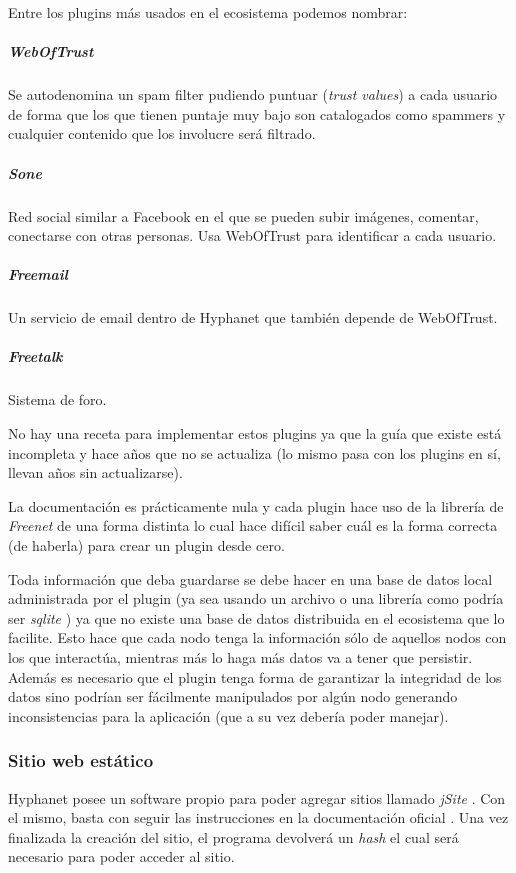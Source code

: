 Entre los plugins más usados en el ecosistema podemos nombrar:

\subparagraph{WebOfTrust} \cite{hyphanet-web-of-trust}
Se autodenomina un spam filter pudiendo puntuar (\textit{trust values}) a cada usuario de forma que los que tienen puntaje muy bajo son catalogados como spammers y cualquier contenido que los involucre será filtrado.

\subparagraph{Sone} \cite{hyphanter-sone}
Red social similar a Facebook en el que se pueden subir imágenes, comentar, conectarse con otras personas. Usa WebOfTrust para identificar a cada usuario.

\subparagraph{Freemail} \cite{hyphanet-freemail}
Un servicio de email dentro de Hyphanet que también depende de WebOfTrust.

\subparagraph{Freetalk} \cite{hyphanet-freetalk}
Sistema de foro.

No hay una receta para implementar estos plugins ya que la guía \cite{hyphanet-plugin-guide} que existe está incompleta y hace años que no se actualiza (lo mismo pasa con los plugins en sí, llevan años sin actualizarse).

La documentación es prácticamente nula y cada plugin hace uso de la librería de \textit{Freenet} de una forma distinta lo cual hace difícil saber cuál es la forma correcta (de haberla) para crear un plugin desde cero.

Toda información que deba guardarse se debe hacer en una base de datos local administrada por el plugin (ya sea usando un archivo o una librería como podría ser \textit{sqlite} \cite{sqlite}) ya que no existe una base de datos distribuida en el ecosistema que lo facilite. Esto hace que cada nodo tenga la información sólo de aquellos nodos con los que interactúa, mientras más lo haga más datos va a tener que persistir. Además es necesario que el plugin tenga forma de garantizar la integridad de los datos sino podrían ser fácilmente manipulados por algún nodo generando inconsistencias para la aplicación (que a su vez debería poder manejar).

\subsubsection{Sitio web estático}

Hyphanet posee un software propio para poder agregar sitios llamado \textit{jSite} \cite{hyphanet-jsite}. Con el mismo, basta con seguir las instrucciones en la documentación oficial \cite{hyphanet-jsite-guide}. Una vez finalizada la creación del sitio, el programa devolverá un \textit{hash} el cual será necesario para poder acceder al sitio.



